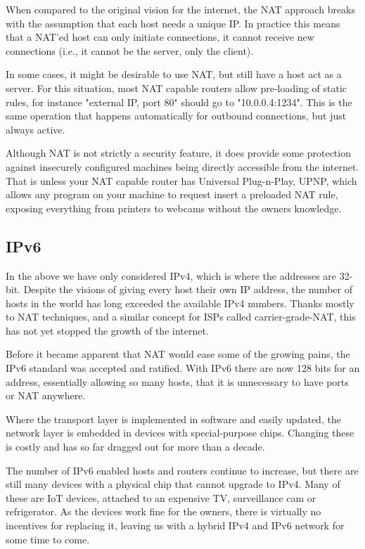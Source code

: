 When compared to the original vision for the internet, the NAT approach breaks with the assumption that each host needs a unique IP. In practice this means that a NAT'ed host can only initiate connections, it cannot receive new connections (i.e., it cannot be the server, only the client). 

In some cases, it might be desirable to use NAT, but still have a host act as a server. For this situation, most NAT capable routers allow pre-loading of static rules, for instance "external IP, port 80" should go to "10.0.0.4:1234". This is the same operation that happens automatically for outbound connections, but just always active.

Although NAT is not strictly a security feature, it does provide some protection against insecurely configured machines being directly accessible from the internet. That is unless your NAT capable router has Universal Plug-n-Play, UPNP, which allows any program on your machine to request insert a preloaded NAT rule, exposing everything from printers to webcams without the owners knowledge.

\subsection{IPv6}
In the above we have only considered IPv4, which is where the addresses are 32-bit. Despite the visions of giving every host their own IP address, the number of hosts in the world has long exceeded the available IPv4 numbers. Thanks mostly to NAT techniques, and a similar concept for ISPs called carrier-grade-NAT, this has not yet stopped the growth of the internet.

Before it became apparent that NAT would ease some of the growing pains, the IPv6 standard was accepted and ratified. With IPv6 there are now 128 bits for an address, essentially allowing so many hosts, that it is unnecessary to have ports or NAT anywhere.

Where the transport layer is implemented in software and easily updated, the network layer is embedded in devices with special-purpose chips. Changing these is costly and has so far dragged out for more than a decade. 

The number of IPv6 enabled hosts and routers continue to increase, but there are still many devices with a physical chip that cannot upgrade to IPv4. Many of these are IoT devices, attached to an expensive TV, surveillance cam or refrigerator. As the devices work fine for the owners, there is virtually no incentives for replacing it, leaving us with a hybrid IPv4 and IPv6 network for some time to come.

